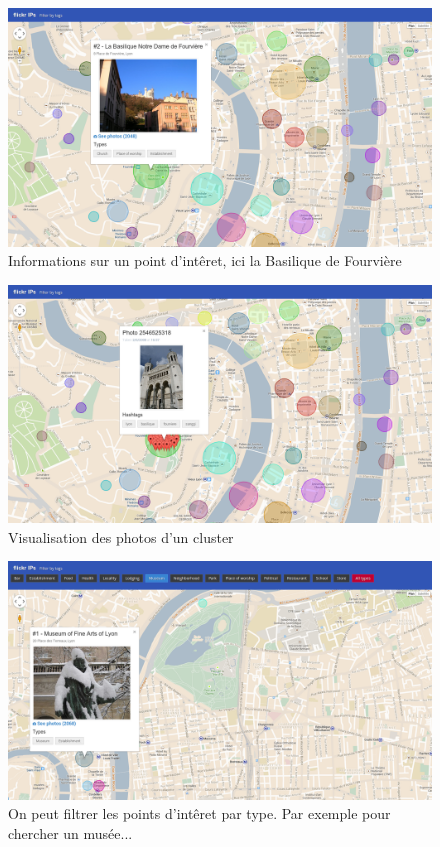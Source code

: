     \begin{figure}[H]
        \centering
        \includegraphics[scale=0.25]{../screenshots/ui-info-cluster.png}
        \caption{Informations sur un point d'intêret, ici la Basilique de Fourvière}
        \label{diagram:ui-info-cluster}
    \end{figure}


    \begin{figure}[H]
        \centering
        \includegraphics[scale=0.25]{../screenshots/ui-info-photo.png}
        \caption{Visualisation des photos d'un cluster}
        \label{diagram:ui-info-photo}
    \end{figure}

    \begin{figure}[H]
        \centering
        \includegraphics[scale=0.25]{../screenshots/ui-filter-museum.png}
        \caption{On peut filtrer les points d'intêret par type. Par exemple pour chercher un musée...}
        \label{diagram:ui-filter-museum}
    \end{figure}

